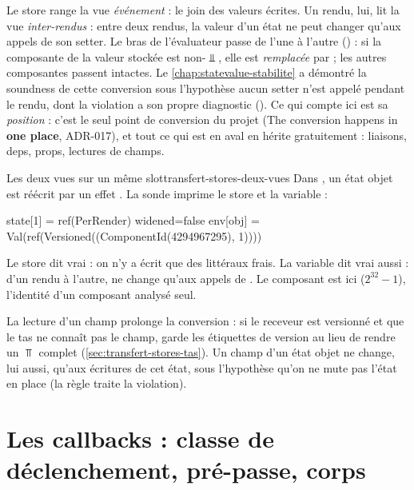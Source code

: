 Le store range la vue \emph{événement} : le join des valeurs écrites. Un
rendu, lui, lit la vue \emph{inter-rendus} : entre deux rendus, la valeur
d'un état ne peut changer qu'aux appels de son setter. Le bras
 de l'évaluateur passe de l'une à l'autre
() : si la composante
 de la valeur stockée est non-$\Bot$, elle est
\emph{remplacée} par  ; les autres
composantes passent intactes. Le \cref{chap:statevalue-stabilite} a
démontré la soundness de cette conversion sous l'hypothèse \og aucun setter
n'est appelé pendant le rendu\fg{}, dont la violation a son propre
diagnostic (). Ce qui compte ici est sa
\emph{position} : c'est le seul point de conversion du projet (\og The
conversion happens in \textbf{one place}\fg{}, ADR-017), et tout ce qui est
en aval en hérite gratuitement : liaisons, deps, props, lectures de champs.

\begin{exemple}{Les deux vues sur un même slot}{transfert-stores-deux-vues}
  Dans , un état objet
   est réécrit par un effet
  . La sonde imprime le store et la variable :
\begin{sortie}
   state[1] = ref(PerRender)   widened=false
   env[obj] = Val(ref(Versioned({(ComponentId(4294967295), 1)})))
\end{sortie}
  Le store dit vrai : on n'y a écrit que des littéraux frais. La variable
  dit vrai aussi : d'un rendu à l'autre,  ne change qu'aux appels
  de . Le composant est ici 
  ($2^{32}-1$), l'identité d'un composant analysé seul.
\end{exemple}

La lecture d'un champ prolonge la conversion : si le receveur est versionné
et que le tas ne connaît pas le champ,  garde les
étiquettes de version au lieu de rendre un $\Top$ complet
(\cref{sec:transfert-stores-tas}). Un champ d'un état objet ne change, lui
aussi, qu'aux écritures de cet état, sous l'hypothèse qu'on ne mute pas
l'état en place (la règle  traite la violation).

\section{Les callbacks : classe de déclenchement, pré-passe, corps}
\label{sec:transfert-stores-callbacks}

